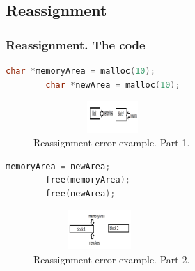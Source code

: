 \documentclass{bredelebeamer}
\begin{document}
\subsection{Reassignment}

\begin{frame}[fragile]
	\frametitle{Reassignment. The code}
	\begin{center}
		\begin{lstlisting}[language=C++, caption={Reassignment error example. Part 1.}]
		char *memoryArea = malloc(10);
		char *newArea = malloc(10);
		\end{lstlisting}

		\begin{figure}
			\includegraphics[height=1.2cm,width=6cm]{reassignment1.png}
			\caption{Reassignment error example. Part 1.}
		\end{figure}

		\begin{lstlisting}[language=C++, caption={Reassignment error example. Part 2.}]
		memoryArea = newArea;
		free(memoryArea);
		free(newArea);
		\end{lstlisting}

		\begin{figure}
			\includegraphics[height=1.5cm,width=5cm]{reassignment2.png}
			\caption{Reassignment error example. Part 2.}
		\end{figure}
	\end{center}
\end{frame}
\end{document}
